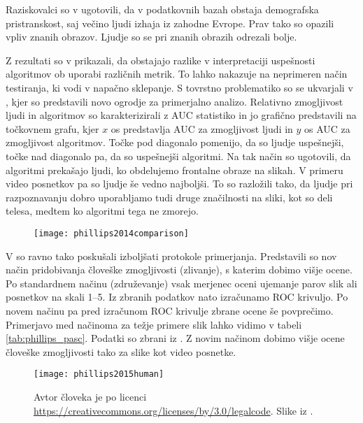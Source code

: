 Raziskovalci so v \cite{best2014unconstrained} ugotovili, da v podatkovnih bazah obstaja demografska pristranskost, saj večino ljudi izhaja iz zahodne Evrope. Prav tako so opazili vpliv znanih obrazov. Ljudje so se pri znanih obrazih odrezali bolje.

Z rezultati so v \cite{best2014unconstrained} prikazali, da obstajajo razlike v interpretaciji uspešnosti algoritmov ob uporabi različnih metrik. To lahko nakazuje na neprimeren način testiranja, ki vodi v napačno sklepanje. S tovrstno problematiko so se ukvarjali v \cite{phillips2014comparison}, kjer so predstavili novo ogrodje za primerjalno analizo. Relativno zmogljivost ljudi in algoritmov so karakterizirali z AUC statistiko in jo grafično predstavili na točkovnem grafu, kjer $x$ os predstavlja AUC za zmogljivost ljudi in $y$ os AUC za zmogljivost algoritmov. Točke pod diagonalo pomenijo, da so ljudje uspešnejši, točke nad diagonalo pa, da so uspešnejši algoritmi. Na tak način so ugotovili, da algoritmi prekašajo ljudi, ko obdelujemo frontalne obraze na slikah. V primeru video posnetkov pa so ljudje še vedno najboljši. To so razložili tako, da ljudje pri razpoznavanju dobro uporabljamo tudi druge značilnosti na sliki, kot so deli telesa, medtem ko algoritmi tega ne zmorejo.

\begin{figure}[!htbp]
	\centering
	\texttt{[image: phillips2014comparison]}
	\caption{}
\end{figure}

V \cite{phillips2015human} so ravno tako poskušali izboljšati protokole primerjanja. Predstavili so nov način pridobivanja človeške zmogljivosti (zlivanje), s katerim dobimo višje ocene. Po standardnem načinu (združevanje) vsak merjenec oceni ujemanje parov slik ali posnetkov na skali 1--5. Iz zbranih podatkov nato izračunamo ROC krivuljo. Po novem načinu pa pred izračunom ROC krivulje zbrane ocene še povprečimo. Primerjavo med načinoma za težje primere slik lahko vidimo v tabeli \ref{tab:phillips_pasc}. Podatki so zbrani iz \cite{phillips2015human}. Z novim načinom dobimo višje ocene človeške zmogljivosti tako za slike kot video posnetke. 


\begin{figure}[!htbp]
	\centering
	\texttt{[image: phillips2015human]}
	\caption{Avtor človeka je \cite{humanicon} po licenci \url{https://creativecommons.org/licenses/by/3.0/legalcode}. Slike iz \cite{huang2007labeled}.}
\end{figure}


